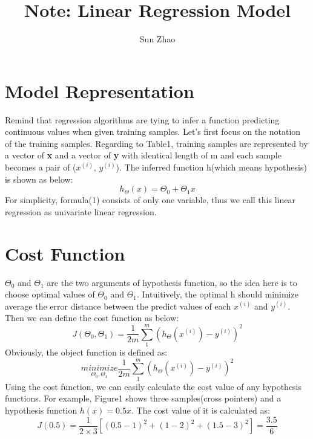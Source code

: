 \documentclass{article}
\title{Note: Linear Regression Model}
\author{Sun Zhao}
\begin{document}
\maketitle
\newpage

\section{Model Representation}
Remind that regression algorithms are tying to infer a function predicting continuous values when given training samples. Let's first focus on the notation of the training samples. Regarding to Table1, training samples are represented by a vector of \textbf{x} and a vector of \textbf{y} with identical length of m and each sample becomes a pair of ($x^{(i)}$, $y^{(i)}$). The inferred function h(which means hypothesis) is shown as below:\\

\begin{equation}\label{hypothesis_function}
  h_\Theta(x)=\Theta_0 + \Theta_1x
\end{equation}
For simplicity, formula(1) consists of only one variable, thus we call this linear regression as univariate linear regression.

\section{Cost Function}
$\Theta_0$ and $\Theta_1$ are the two arguments of hypothesis function, so the idea here is to choose optimal values of $\Theta_0$ and $\Theta_1$. Intuitively, the optimal h should minimize average the error distance between the predict values of each $x^(i)$ and $y^(i)$. Then we can define the cost function as below:
\begin{equation}\label{cost_function}
J(\Theta_0, \Theta_1) = \frac{1}{2m} \sum_{1}^{m} (h_\Theta({x^{(i)}})-y^{(i)})^2
\end{equation}
Obviously, the object function is defined as:
\begin{equation}\label{object_function}
\underset{\Theta_0, \Theta_1}{minimize} \frac{1}{2m} \sum_{1}^{m} (h_\Theta({x^{(i)}})-y^{(i)})^2
\end{equation}
Using the cost function, we can easily calculate the cost value of any hypothesis functions. For example, Figure1 shows three samples(cross pointers) and a hypothesis function $h(x)=0.5x$. The cost value of it is calculated as:
\begin{equation}\label{cost_function_example}
J(0.5)=\frac{1}{2 \times 3}[(0.5-1)^2 + (1-2)^2 + (1.5-3)^2]=\frac {3.5}{6}
\end{equation}
\end{document}
